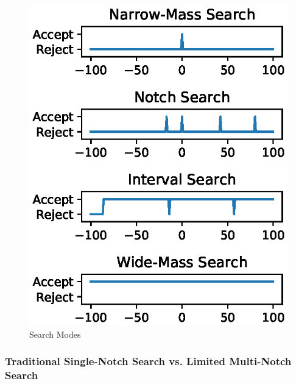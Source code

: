 \documentclass[journal=jprobs,manuscript=article]{achemso}
\begin{document}
\begin{figure}
\includegraphics{fig1-searchTypes.eps}
\caption{Search Modes}
\label{fig:fig1-searchtypes}
\end{figure}

\subsubsection{Traditional Single-Notch Search vs. Limited Multi-Notch Search}
\end{document}
